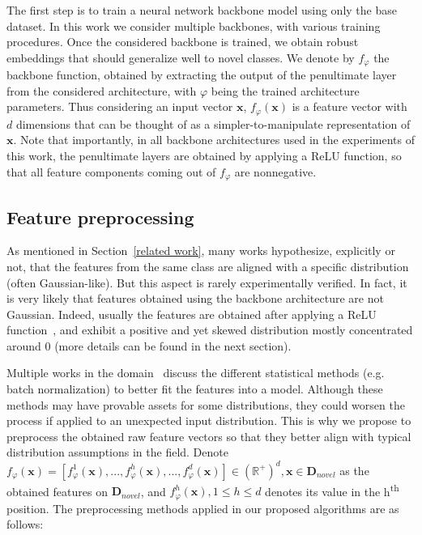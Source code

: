 \documentclass[review]{elsarticle}
\begin{document}
The first step is to train a neural network backbone model using only the base dataset. In this work we consider multiple backbones, with various training procedures. Once the considered backbone is trained, we obtain robust embeddings that should generalize well to novel classes. We denote by $f_\varphi$ the backbone function, obtained by extracting the output of the penultimate layer from the considered architecture, with $\varphi$ being the trained architecture parameters. Thus considering an input vector $\mathbf{x}$, $ f_\varphi(\mathbf{x})$ is a feature vector with $d$ dimensions that can be thought of as a simpler-to-manipulate representation of $\mathbf{x}$.
Note that importantly, in all backbone architectures used in the experiments of this work, the penultimate layers are obtained by applying a ReLU function, so that all feature components coming out of $f_\varphi$ are nonnegative.

\subsection{Feature preprocessing}

As mentioned in Section~\ref{related work}, many works hypothesize, explicitly or not, that the features from the same class are aligned with a specific distribution (often Gaussian-like). But this aspect is rarely experimentally verified. In fact, it is very likely that features obtained using the backbone architecture are not Gaussian. Indeed, usually the features are obtained after applying a ReLU function~\cite{DBLP:journals/corr/abs-1803-08375}, and exhibit a positive and yet skewed distribution mostly concentrated around 0 (more details can be found in the next section). 



Multiple works in the domain~\cite{DBLP:journals/corr/abs-1911-04623, lichtenstein2020tafssl} discuss the different statistical methods (e.g. batch normalization) to better fit the features into a model. Although these methods may have provable assets for some distributions, they could worsen the process if applied to an unexpected input distribution. This is why we propose to preprocess the obtained raw feature vectors so that they better align with typical distribution assumptions in the field. Denote $ f_\varphi(\mathbf{x})=[f^{1}_\varphi(\mathbf{x}), ..., f^{h}_\varphi(\mathbf{x}), ..., f^{d}_\varphi(\mathbf{x})]\in{\left({\mathbb{R}^+}\right)}^d, \mathbf{x}\in \mathbf{D}_{novel}$ as the obtained features on $\mathbf{D}_{novel}$, and $f^{h}_\varphi(\mathbf{x}), 1\leq h\leq d$ denotes its value in the h\textsuperscript{th} position. The preprocessing methods applied in our proposed algorithms are as follows:  
\end{document}
